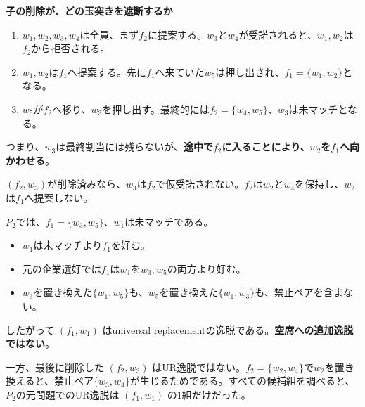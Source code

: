\documentclass[a4paper,10pt]{ltjsarticle}
\newcommand{\set}[1]{\{#1\}}
\newcommand{\hd}[1]{\vspace{5pt}{\large\bfseries #1}\par}
\begin{document}
\newpage
{\LARGE\bfseries 子の削除が、どの玉突きを遮断するか}

\hd{元問題では、最終的に不採用のw3の仮受諾が効く}
\begin{enumerate}
 \item $w_1,w_2,w_3,w_4$は全員、まず$f_2$に提案する。$w_3$と$w_4$が受諾されると、$w_1,w_2$は$f_2$から拒否される。
 \item $w_1,w_2$は$f_1$へ提案する。先に$f_1$へ来ていた$w_5$は押し出され、$f_1=\set{w_1,w_2}$となる。
 \item $w_5$が$f_2$へ移り、$w_3$を押し出す。最終的には$f_2=\set{w_4,w_5}$、$w_3$は未マッチとなる。
\end{enumerate}
つまり、$w_3$は最終割当には残らないが、\textbf{途中で$f_2$に入ることにより、$w_2$を$f_1$へ向かわせる}。

\hd{子でw3をf2から削除すると、その経路が消える}
$(f_2,w_3)$が削除済みなら、$w_3$は$f_2$で仮受諾されない。$f_2$は$w_2$と$w_4$を保持し、$w_2$は$f_1$へ提案しない。
\begin{center}
\end{center}

\hd{P2のUR逸脱を直接検査する}
$P_2$では、$f_1=\set{w_3,w_5}$、$w_1$は未マッチである。
\begin{itemize}
 \item $w_1$は未マッチより$f_1$を好む。
 \item 元の企業選好では$f_1$は$w_1$を$w_3,w_5$の両方より好む。
 \item $w_3$を置き換えた$\set{w_1,w_5}$も、$w_5$を置き換えた$\set{w_1,w_3}$も、禁止ペアを含まない。
\end{itemize}
したがって $(f_1,w_1)$ はuniversal replacementの逸脱である。\textbf{空席への追加逸脱ではない}。

一方、最後に削除した $(f_2,w_3)$ はUR逸脱ではない。$f_2=\set{w_2,w_4}$で$w_2$を置き換えると、禁止ペア$\set{w_3,w_4}$が生じるためである。すべての候補組を調べると、$P_2$の元問題でのUR逸脱は $(f_1,w_1)$ の1組だけだった。
\end{document}
